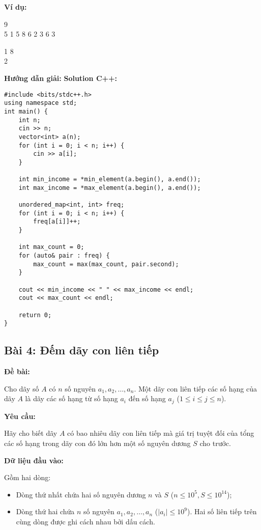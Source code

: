 \documentclass[12pt]{scrartcl}  %
\begin{document}
\textbf{Ví dụ:}
\begin{tcolorbox}[colback=gray!5!white, colframe=blue!50!black, title=Input]
9\\
5 1 5 8 6 2 3 6 3
\end{tcolorbox}
\begin{tcolorbox}[colback=gray!5!white, colframe=green!50!black, title=Output]
1 8\\
2
\end{tcolorbox}
\textbf{Hướng dẫn giải:}
\textbf{Solution C++:}
\begin{lstlisting}
#include <bits/stdc++.h>
using namespace std;
int main() {
    int n;
    cin >> n;
    vector<int> a(n);
    for (int i = 0; i < n; i++) {
        cin >> a[i];
    }
    
    int min_income = *min_element(a.begin(), a.end());
    int max_income = *max_element(a.begin(), a.end());
    
    unordered_map<int, int> freq;
    for (int i = 0; i < n; i++) {
        freq[a[i]]++;
    }
    
    int max_count = 0;
    for (auto& pair : freq) {
        max_count = max(max_count, pair.second);
    }
    
    cout << min_income << " " << max_income << endl;
    cout << max_count << endl;
    
    return 0;
}
\end{lstlisting}

\subsection{Bài 4: Đếm dãy con liên tiếp}
\textbf{Đề bài:}

Cho dãy số $A$ có $n$ số nguyên $a_1, a_2, \ldots, a_n$. Một dãy con liên tiếp các số hạng của dãy $A$ là dãy các số hạng từ số hạng $a_i$ đến số hạng $a_j$ ($1 \leq i \leq j \leq n$).

\textbf{Yêu cầu:}

Hãy cho biết dãy $A$ có bao nhiêu dãy con liên tiếp mà giá trị tuyệt đối của tổng các số hạng trong dãy con đó lớn hơn một số nguyên dương $S$ cho trước.

\textbf{Dữ liệu đầu vào:}

Gồm hai dòng:
\begin{itemize}
    \item Dòng thứ nhất chứa hai số nguyên dương $n$ và $S$ ($n \leq 10^5, S \leq 10^{14}$);
    \item Dòng thứ hai chứa $n$ số nguyên $a_1, a_2, \ldots, a_n$ ($|a_i| \leq 10^9$). Hai số liên tiếp trên cùng dòng được ghi cách nhau bởi dấu cách.
\end{itemize}
\end{document}
